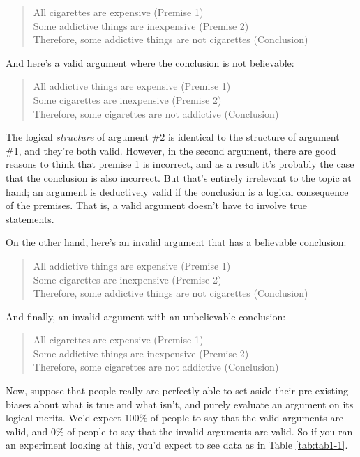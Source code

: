\documentclass[
]{book}
\begin{document}
\begin{quote}
All cigarettes are expensive (Premise 1)\\
Some addictive things are inexpensive (Premise 2)\\
Therefore, some addictive things are not cigarettes (Conclusion)
\end{quote}

And here's a valid argument where the conclusion is not believable:

\begin{quote}
All addictive things are expensive (Premise 1)\\
Some cigarettes are inexpensive (Premise 2)\\
Therefore, some cigarettes are not addictive (Conclusion)
\end{quote}

The logical \emph{structure} of argument \#2 is identical to the structure of argument \#1, and they're both valid. However, in the second argument, there are good reasons to think that premise 1 is incorrect, and as a result it's probably the case that the conclusion is also incorrect. But that's entirely irrelevant to the topic at hand; an argument is deductively valid if the conclusion is a logical consequence of the premises. That is, a valid argument doesn't have to involve true statements.

On the other hand, here's an invalid argument that has a believable conclusion:

\begin{quote}
All addictive things are expensive (Premise 1)\\
Some cigarettes are inexpensive (Premise 2)\\
Therefore, some addictive things are not cigarettes (Conclusion)
\end{quote}

And finally, an invalid argument with an unbelievable conclusion:

\begin{quote}
All cigarettes are expensive (Premise 1)\\
Some addictive things are inexpensive (Premise 2)\\
Therefore, some cigarettes are not addictive (Conclusion)
\end{quote}

Now, suppose that people really are perfectly able to set aside their pre-existing biases about what is true and what isn't, and purely evaluate an argument on its logical merits. We'd expect 100\% of people to say that the valid arguments are valid, and 0\% of people to say that the invalid arguments are valid. So if you ran an experiment looking at this, you'd expect to see data as in Table \ref{tab:tab1-1}.
\end{document}
